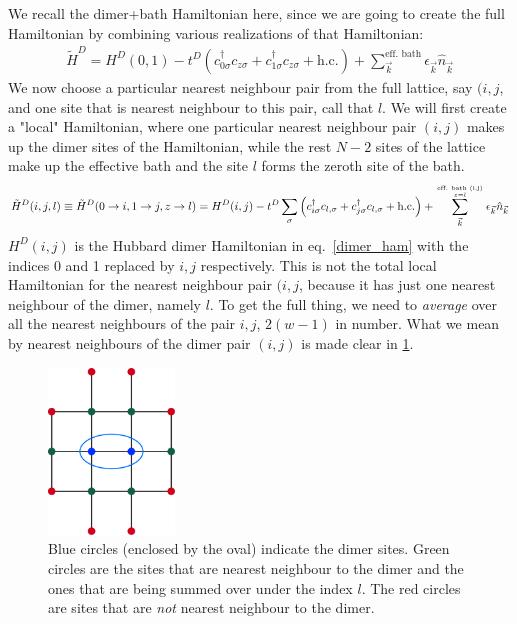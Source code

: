 \documentclass{report}
\numberwithin{equation}{section}
\begin{document}
We recall the dimer+bath Hamiltonian here, since we are going to create the full Hamiltonian by combining various realizations of that Hamiltonian:
\begin{equation}\begin{aligned}
	\tilde H^D = H^D(0,1) - t^D \left(c^\dagger_{0\sigma}c_{z\sigma} + c^\dagger_{1\sigma}c_{z\sigma} + \text{h.c.}\right) + \sum_{\vec k}^\text{eff. bath}\epsilon_{\vec k}\hat n_{\vec k}
\end{aligned}\end{equation}
We now choose a particular nearest neighbour pair from the full lattice, say \((i,j\), and one site that is nearest neighbour to this pair, call that \(l\). We will first create a "local" Hamiltonian, where one particular nearest neighbour pair \((i,j)\) makes up the dimer sites of the Hamiltonian, while the rest \(N-2\) sites of the lattice make up the effective bath and the site \(l\) forms the zeroth site of the bath.
\begin{equation}\begin{aligned}
	\label{Hdjl}
	\tilde H^D(i, j, l) \equiv \tilde H^D(0\to i, 1\to j, z \to l) = H^D(i, j) - t^D \sum_{\sigma}\left(c^\dagger_{i\sigma}c_{l,\sigma} + c^\dagger_{j\sigma}c_{l,\sigma} + \text{h.c.}\right) + \sum_{\vec k}^{\text{eff. bath (i,j)}\atop{z = l}}\epsilon_{\vec k}\hat n_{\vec k}\\
\end{aligned}\end{equation}
\(H^D(i, j)\) is the Hubbard dimer Hamiltonian in eq.~\ref{dimer_ham} with the indices 0 and 1 replaced by \(i, j\) respectively. This is not the total local Hamiltonian for the nearest neighbour pair \((i,j\), because it has just one nearest neighbour of the dimer, namely \(l\). To get the full thing, we need to \textit{average} over all the nearest neighbours of the pair \(i,j\), \(2(w-1)\) in number. What we mean by nearest neighbours of the dimer pair \((i,j)\) is made clear in \ref{dimer-nn}.
\begin{figure}[htpb]
	\centering
	\includegraphics[width=0.3\textwidth]{../figures/dimer-nn.pdf}
	\caption{Blue circles (enclosed by the oval) indicate the dimer sites. Green circles are the sites that are nearest neighbour to the dimer and the ones that are being summed over under the index \(l\). The red circles are sites that are \textit{not} nearest neighbour to the dimer.}
	\label{dimer-nn}
\end{figure}
\end{document}

